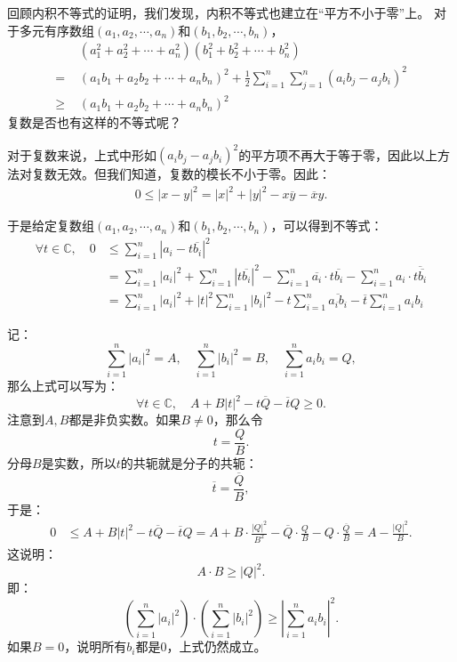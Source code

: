 \documentclass[12pt,UTF8]{ctexbook}
\begin{document}
\begin{appendix}
回顾内积不等式的证明，我们发现，内积不等式也建立在“平方不小于零”上。
对于多元有序数组$(a_1, a_2, \cdots, a_n)$和$(b_1, b_2, \cdots, b_n)$，
\begin{align*}
    &(a_1^2 + a_2^2 + \cdots + a_n^2)(b_1^2 + b_2^2 + \cdots + b_n^2)  \\
    =\,\,& (a_1b_1 + a_2b_2 + \cdots + a_nb_n)^2 + \frac{1}{2}\sum_{i=1}^n\sum_{j=1}^n(a_ib_j - a_jb_i)^2  \\
    \geqslant\,\,& (a_1b_1 + a_2b_2 + \cdots + a_nb_n)^2  
\end{align*}
复数是否也有这样的不等式呢？

对于复数来说，上式中形如$(a_ib_j - a_jb_i)^2$的平方项不再大于等于零，因此以上方法对复数无效。但我们知道，复数的模长不小于零。因此：
\begin{align*}
    0 \leqslant |x - y|^2 = |x|^2 + |y|^2 - x\overline{y} - \overline{x} y.
\end{align*}

于是给定复数组$(a_1, a_2, \cdots, a_n)$和$(b_1, b_2, \cdots, b_n)$，可以得到不等式：
\begin{align*}
    \forall t \in \mathbb{C}, \quad 0 &\leqslant \sum_{i=1}^n |a_i - t\overline{b_i}|^2 \\
    &= \sum_{i=1}^n |a_i|^2 + \sum_{i=1}^n |t \overline{b_i}|^2 - \sum_{i=1}^n \overline{a_i} \cdot t\overline{b_i} - \sum_{i=1}^n a_i \cdot \overline{t \overline{b_i}} \\
    &= \sum_{i=1}^n |a_i|^2 + |t|^2 \sum_{i=1}^n |b_i|^2 - t\sum_{i=1}^n \overline{a_ib_i} - \overline{t}\sum_{i=1}^n a_ib_i
\end{align*}

记：
$$ \sum_{i=1}^n |a_i|^2 = A, \quad \sum_{i=1}^n |b_i|^2 = B, \quad \sum_{i=1}^n a_ib_i = Q, $$
那么上式可以写为：
$$ \forall t \in \mathbb{C}, \quad A + B |t|^2 - t\overline{Q} - \overline{t}Q \geqslant 0. $$
注意到$A,B$都是非负实数。如果$ B \neq 0$，那么令
$$ t = \frac{Q}{B}. $$
分母$B$是实数，所以$t$的共轭就是分子的共轭：
$$\overline{t} = \frac{\overline{Q}}{B}, $$
于是：
\begin{align*}
    0 &\leqslant A + B |t|^2 - t\overline{Q} - \overline{t}Q = A + B \cdot \frac{|Q|^2}{B^2} - \overline{Q}\cdot \frac{Q}{B} - Q\cdot \frac{\overline{Q}}{B} = A - \frac{|Q|^2}{B}.
\end{align*}
这说明：
$$ A \cdot B \geqslant |Q|^2.$$
即：
$$ \left(\sum_{i=1}^n |a_i|^2\right)\cdot\left(\sum_{i=1}^n |b_i|^2\right)\geqslant \left|\sum_{i=1}^n a_ib_i\right|^2. $$
如果$B = 0$，说明所有$b_i$都是$0$，上式仍然成立。


\end{appendix}
\end{document}
